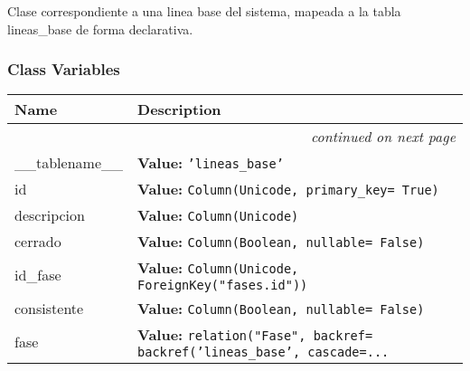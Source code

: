 Clase correspondiente a una linea base del sistema, mapeada a la tabla 
lineas\_base de forma declarativa.



  \subsubsection{Class Variables}

    \vspace{-1cm}
\hspace{\varindent}\begin{longtable}{|p{\varnamewidth}|p{\vardescrwidth}|l}
\cline{1-2}
\cline{1-2} \centering \textbf{Name} & \centering \textbf{Description}& \\
\cline{1-2}
\endhead\cline{1-2}\multicolumn{3}{r}{\small\textit{continued on next page}}\\\endfoot\cline{1-2}
\endlastfoot\raggedright \_\-\_\-t\-a\-b\-l\-e\-n\-a\-m\-e\-\_\-\_\- & \raggedright \textbf{Value:} 
{\tt 'lineas\_base'}&\\
\cline{1-2}
\raggedright i\-d\- & \raggedright \textbf{Value:} 
{\tt Column(Unicode, primary\_key= True)}&\\
\cline{1-2}
\raggedright d\-e\-s\-c\-r\-i\-p\-c\-i\-o\-n\- & \raggedright \textbf{Value:} 
{\tt Column(Unicode)}&\\
\cline{1-2}
\raggedright c\-e\-r\-r\-a\-d\-o\- & \raggedright \textbf{Value:} 
{\tt Column(Boolean, nullable= False)}&\\
\cline{1-2}
\raggedright i\-d\-\_\-f\-a\-s\-e\- & \raggedright \textbf{Value:} 
{\tt Column(Unicode, ForeignKey("fases.id"))}&\\
\cline{1-2}
\raggedright c\-o\-n\-s\-i\-s\-t\-e\-n\-t\-e\- & \raggedright \textbf{Value:} 
{\tt Column(Boolean, nullable= False)}&\\
\cline{1-2}
\raggedright f\-a\-s\-e\- & \raggedright \textbf{Value:} 
{\tt relation("Fase", backref= backref('lineas\_base', cascade=\texttt{...}}&\\
\cline{1-2}
\end{longtable}


